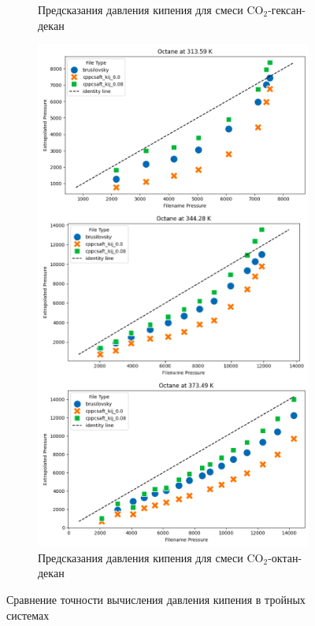 \documentclass[a4paper,12pt]{article}
\begin{document}
\begin{itemize}
\begin{itemize}
\begin{figure}[ht]
\begin{subfigure}{0.48\textwidth}
        \caption{Предсказания давления кипения для смеси $\mathrm{CO}_2$-гексан-декан}
        \label{fig:accuracy_hexane}
    \end{subfigure}
    \quad
    \begin{subfigure}{0.48\textwidth}
        \centering
        \includegraphics[width=\textwidth]{images/3_octane_boiling.png} %
        \caption{Предсказания давления кипения для смеси $\mathrm{CO}_2$-октан-декан}
        \label{fig:accuracy_octane}
    \end{subfigure}
    \caption{Сравнение точности вычисления давления кипения в тройных системах}
    \label{fig:accuracy_comparison}
\end{figure}
	\end{itemize}
\end{itemize}
\end{document}
